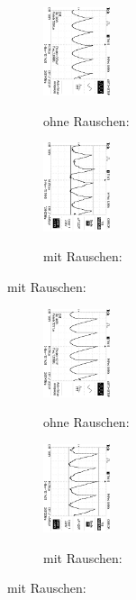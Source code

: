 \begin{figure}
\caption{$U_{out} (\phi = 180°$) }
\begin{subfigure}{0.48\textwidth}
\centering
\caption*{ohne Rauschen:}
\includegraphics[angle=90,height=2.6cm]{graphics/ALL0034/F0034TEK.jpg}
\label{fig:phi180o}
\end{subfigure}
\begin{subfigure}{0.48\textwidth}
\centering
\caption*{mit Rauschen:}
\includegraphics[angle=90,height=2.6cm]{graphics/ALL0042/F0042TEK.jpg}
\label{fig:phi180m}
\end{subfigure}
\end{figure}
\addtocounter{figure}{-1}
\begin{figure}
\caption{$U_{out} (\phi = 210°$)}
\begin{subfigure}{0.48\textwidth}
\centering
\caption*{ohne Rauschen:}
\includegraphics[angle=90,height=2.6cm]{graphics/ALL0036/F0036TEK.jpg}
\label{fig:phi210o}
\end{subfigure}
\begin{subfigure}{0.48\textwidth}
\centering
\caption*{mit Rauschen:}
\includegraphics[angle=90,height=2.6cm]{graphics/ALL0044/F0044TEK.jpg}
\label{fig:phi210m}
\end{subfigure}
\end{figure}
\addtocounter{figure}{-1}
